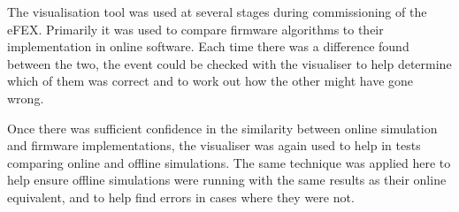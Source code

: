 
The visualisation tool was used at several stages during commissioning of the
\ac{eFEX}. Primarily it was used to compare firmware algorithms to their
implementation in online software. Each time there was a difference found
between the two, the event could be checked with the visualiser to help
determine which of them was correct and to work out how the other might have
gone wrong.

Once there was sufficient confidence in the similarity between online simulation
and firmware implementations, the visualiser was again used to help in tests
comparing online and offline simulations. The same technique was applied here to
help ensure offline simulations were running with the same results as their
online equivalent, and to help find errors in cases where they were not.

